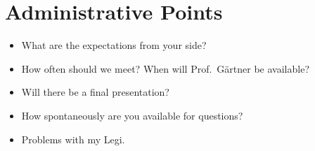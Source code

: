 \documentclass[11pt]{scrreprt}
\begin{document}
\section*{Administrative Points}

\begin{itemize}
    \item What are the expectations from your side?
    \item How often should we meet? When will Prof.\ Gärtner be
          available?
    \item Will there be a final presentation?
    \item How spontaneously are you available for questions?
    \item Problems with my Legi.
\end{itemize}
\end{document}
